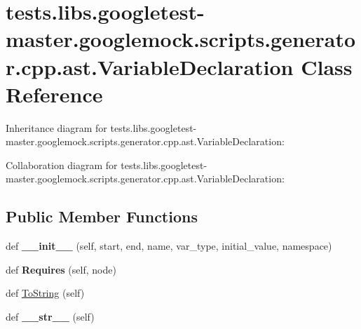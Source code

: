 \hypertarget{classtests_1_1libs_1_1googletest-master_1_1googlemock_1_1scripts_1_1generator_1_1cpp_1_1ast_1_1VariableDeclaration}{}\section{tests.\+libs.\+googletest-\/master.googlemock.\+scripts.\+generator.\+cpp.\+ast.\+Variable\+Declaration Class Reference}
\label{classtests_1_1libs_1_1googletest-master_1_1googlemock_1_1scripts_1_1generator_1_1cpp_1_1ast_1_1VariableDeclaration}


Inheritance diagram for tests.\+libs.\+googletest-\/master.googlemock.\+scripts.\+generator.\+cpp.\+ast.\+Variable\+Declaration\+:


Collaboration diagram for tests.\+libs.\+googletest-\/master.googlemock.\+scripts.\+generator.\+cpp.\+ast.\+Variable\+Declaration\+:
\subsection*{Public Member Functions}
\begin{DoxyCompactItemize}
\item 
\mbox{\label{classtests_1_1libs_1_1googletest-master_1_1googlemock_1_1scripts_1_1generator_1_1cpp_1_1ast_1_1VariableDeclaration_a15729bdcc23ac60af9723f53c14617f3}} 
def {\bfseries \+\_\+\+\_\+init\+\_\+\+\_\+} (self, start, end, name, var\+\_\+type, initial\+\_\+value, namespace)
\item 
\mbox{\label{classtests_1_1libs_1_1googletest-master_1_1googlemock_1_1scripts_1_1generator_1_1cpp_1_1ast_1_1VariableDeclaration_a68b9e9c522cbc91c65b1b50ed968673e}} 
def {\bfseries Requires} (self, node)
\item 
def \hyperlink{classtests_1_1libs_1_1googletest-master_1_1googlemock_1_1scripts_1_1generator_1_1cpp_1_1ast_1_1VariableDeclaration_a6da6efe50bd344bf194e8e8748519ed3}{To\+String} (self)
\item 
\mbox{\label{classtests_1_1libs_1_1googletest-master_1_1googlemock_1_1scripts_1_1generator_1_1cpp_1_1ast_1_1VariableDeclaration_ae62d22d0f3b4513783c33589d9524b0a}} 
def {\bfseries \+\_\+\+\_\+str\+\_\+\+\_\+} (self)
\end{DoxyCompactItemize}

